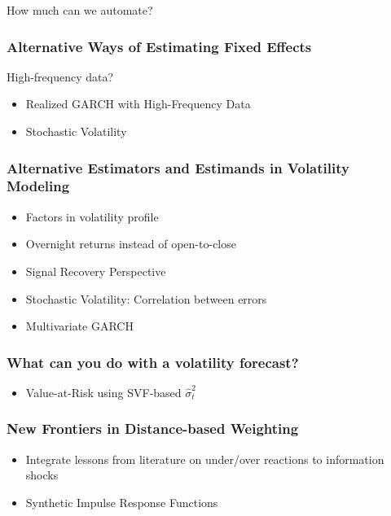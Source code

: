 \documentclass[9pt]{beamer}
\theoremstyle{definition}
\begin{document}
\begin{frame}{How much can we automate?}

    
\end{frame}

\begin{frame}
\frametitle{Alternative Ways of Estimating Fixed Effects}
High-frequency data?

\begin{itemize}

\item{Realized GARCH with High-Frequency Data}

\item{Stochastic Volatility}
\end{itemize}
\end{frame}

\begin{frame}
    \frametitle{Alternative Estimators and Estimands in Volatility Modeling}
    \begin{itemize}
        
        \item Factors in volatility profile
        \item Overnight returns instead of open-to-close
        
        \item Signal Recovery Perspective \parencite{ferwana2022optimal}
        
        \item Stochastic Volatility: Correlation between errors
        \item Multivariate GARCH
        
        \end{itemize}
\end{frame}

\begin{frame}
    \frametitle{What can you do with a volatility forecast?}
    \begin{itemize}
        \item{Value-at-Risk using SVF-based $\hat\sigma^{2}_{t}$}
        \end{itemize}
\end{frame}

\begin{frame}
    \frametitle{New Frontiers in Distance-based Weighting}
    \begin{itemize}
        \item Integrate lessons from literature on under/over reactions to information shocks \parencite[][]{jiang2017information}
        \item{Synthetic Impulse Response Functions}
        \end{itemize}
\end{frame}
\end{document}
